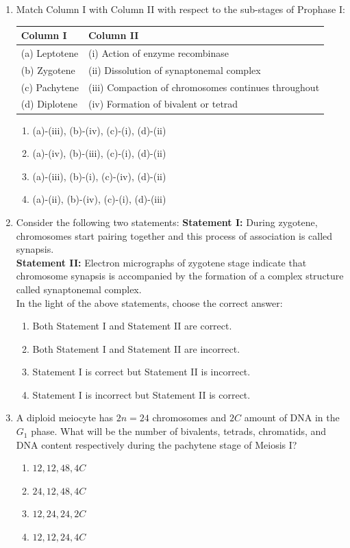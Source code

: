 \documentclass[11pt,a4paper]{article}
\begin{document}
\begin{enumerate}[label=\textbf{\arabic*.}]
\item Match Column I with Column II with respect to the sub-stages of Prophase I:
\begin{center}
\begin{tabular}{ll}
\toprule
\textbf{Column I} & \textbf{Column II} \\
\midrule
(a) Leptotene & (i) Action of enzyme recombinase \\
(b) Zygotene & (ii) Dissolution of synaptonemal complex \\
(c) Pachytene & (iii) Compaction of chromosomes continues throughout \\
(d) Diplotene & (iv) Formation of bivalent or tetrad \\
\bottomrule
\end{tabular}
\end{center}
\begin{enumerate}[label=(\Alph*)]
    \item (a)-(iii), (b)-(iv), (c)-(i), (d)-(ii)
    \item (a)-(iv), (b)-(iii), (c)-(i), (d)-(ii)
    \item (a)-(iii), (b)-(i), (c)-(iv), (d)-(ii)
    \item (a)-(ii), (b)-(iv), (c)-(i), (d)-(iii)
\end{enumerate}

\item Consider the following two statements:
\textbf{Statement I:} During zygotene, chromosomes start pairing together and this process of association is called synapsis.\\
\textbf{Statement II:} Electron micrographs of zygotene stage indicate that chromosome synapsis is accompanied by the formation of a complex structure called synaptonemal complex.\\
In the light of the above statements, choose the correct answer:
\begin{enumerate}[label=(\Alph*)]
    \item Both Statement I and Statement II are correct.
    \item Both Statement I and Statement II are incorrect.
    \item Statement I is correct but Statement II is incorrect.
    \item Statement I is incorrect but Statement II is correct.
\end{enumerate}

\item A diploid meiocyte has $2n = 24$ chromosomes and $2C$ amount of DNA in the $G_1$ phase. What will be the number of bivalents, tetrads, chromatids, and DNA content respectively during the pachytene stage of Meiosis I?
\begin{enumerate}[label=(\Alph*)]
    \item $12, 12, 48, 4C$
    \item $24, 12, 48, 4C$
    \item $12, 24, 24, 2C$
    \item $12, 12, 24, 4C$
\end{enumerate}


\end{enumerate}
\end{document}
